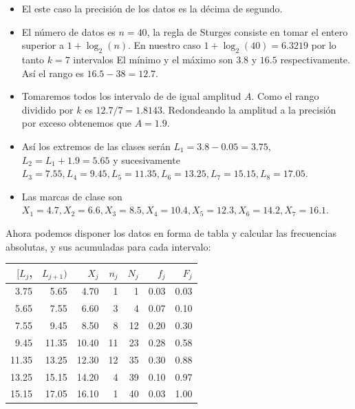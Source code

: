 \begin{frame}
\begin{itemize}
\item El este caso la precisión de los datos es la décima de segundo.
\item El número de datos es $n=40$, la regla de Sturges consiste en tomar el entero superior a $1+\log_{2}(n)$. 
En nuestro caso $1+\log_{2}(40)=6.3219$ por lo tanto $k=7$ intervalos
El mínimo y el máximo son $3.8$ y $16.5$ respectivamente. Así el rango es $16.5-38=12.7$.
\item Tomaremos todos los intervalo de de igual amplitud $A$. Como  el rango dividido por $k$ es $12.7/7= 1.8143$.
Redondeando la amplitud a  la precisión por exceso obtenemos que $A=1.9$.
\end{itemize}
\end{frame}

\begin{frame}
\begin{itemize}
\item Así los extremos de las clases serán $L_1=3.8-0.05=3.75$, $L_2=L_1+1.9=5.65$ y sucesivamente
$L_3= 7.55, L_4=  9.45, L_5= 11.35, L_6= 13.25, L_7= 15.15, L_8= 17.05$.
\item Las marcas de clase  son $X_1=4.7, X_2=6.6, X_3= 8.5, X_4=  10.4, X_5= 12.3, X_6= 14.2, X_7= 16.1$.
\end{itemize}
\end{frame}

\begin{frame}
Ahora podemos disponer los datos en forma de tabla y calcular las frecuencias absolutas, y sus acumuladas para cada intervalo:
\begin{table}[ht]
\begin{center}
\begin{tabular}{rrrrrrr}
  \hline
$[L_j$, & $L_{j+1})$ & $X_j$ & $n_j$ & $N_j$ & $f_j$ & $F_j$ \\ 
  \hline
3.75 & 5.65 & 4.70 &   1 &   1 & 0.03 & 0.03 \\ 
  5.65 & 7.55 & 6.60 &   3 &   4 & 0.07 & 0.10 \\ 
  7.55 & 9.45 & 8.50 &   8 &  12 & 0.20 & 0.30 \\ 
  9.45 & 11.35 & 10.40 &  11 &  23 & 0.28 & 0.58 \\ 
  11.35 & 13.25 & 12.30 &  12 &  35 & 0.30 & 0.88 \\ 
  13.25 & 15.15 & 14.20 &   4 &  39 & 0.10 & 0.97 \\ 
  15.15 & 17.05 & 16.10 &   1 &  40 & 0.03 & 1.00 \\ 
   \hline
\end{tabular}
\end{center}
\end{table}
\end{frame}

